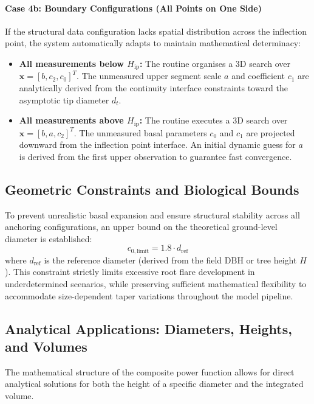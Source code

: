 \documentclass[twocolumn, bibliography=totoc]{scrartcl}
\begin{document}
\paragraph{Case 4b: Boundary Configurations (All Points on One Side)}
If the structural data configuration lacks spatial distribution across the inflection point, the system automatically adapts to maintain mathematical determinacy:
\begin{itemize}
    \item \textbf{All measurements below $H_{\text{ip}}$:} The routine organises a 3D search over $\mathbf{x} = [b, c_2, c_0]^T$. The unmeasured upper segment scale $a$ and coefficient $c_1$ are analytically derived from the continuity interface constraints toward the asymptotic tip diameter $d_t$.
    \item \textbf{All measurements above $H_{\text{ip}}$:} The routine executes a 3D search over $\mathbf{x} = [b, a, c_2]^T$. The unmeasured basal parameters $c_0$ and $c_1$ are projected downward from the inflection point interface. An initial dynamic guess for $a$ is derived from the first upper observation to guarantee fast convergence.
\end{itemize}

\subsection{Geometric Constraints and Biological Bounds}
To prevent unrealistic basal expansion and ensure structural stability across all anchoring configurations, an upper bound on the theoretical ground-level diameter is established:
\begin{equation}
    c_{0,\text{limit}} = 1.8 \cdot d_{\text{ref}}
\end{equation}
where $d_{\text{ref}}$ is the reference diameter (derived from the field $\text{DBH}$ or tree height $H$). This constraint strictly limits excessive root flare development in underdetermined scenarios, while preserving sufficient mathematical flexibility to accommodate size-dependent taper variations throughout the model pipeline.


\subsection{Analytical Applications: Diameters, Heights, and Volumes}

The mathematical structure of the composite power function allows for direct analytical solutions for both the height of a specific diameter and the integrated volume.
\end{document}
